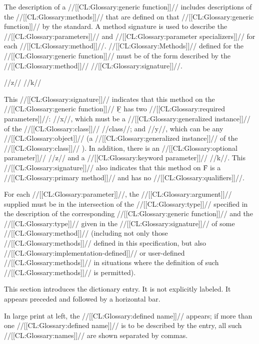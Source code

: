 The description of a //[[CL:Glossary:generic function]]// includes descriptions of the
//[[CL:Glossary:methods]]// that are defined on that //[[CL:Glossary:generic function]]// by the standard.  
A method signature is used to describe the //[[CL:Glossary:parameters]]// and 
//[[CL:Glossary:parameter specializers]]// for each //[[CL:Glossary:method]]//. 
//[[CL:Glossary:Methods]]// defined for the //[[CL:Glossary:generic function]]// must be of the form described
by the //[[CL:Glossary:method]]// //[[CL:Glossary:signature]]//. 

 {
	      {\opt} //z// {\key} //k//}

\noindent This //[[CL:Glossary:signature]]// indicates that this method on the //[[CL:Glossary:generic function]]//
\b{F} has two //[[CL:Glossary:required parameters]]//:
     //x//, which must be a //[[CL:Glossary:generalized instance]]// of the //[[CL:Glossary:class]]// //class//;
 and //y//, which can  be any //[[CL:Glossary:object]]// 
       (\ie a //[[CL:Glossary:generalized instance]]// of the //[[CL:Glossary:class]]// ).
In addition, there is an //[[CL:Glossary:optional parameter]]// //z// and a
//[[CL:Glossary:keyword parameter]]// //k//.  This //[[CL:Glossary:signature]]// also indicates that this
method on \f{F} is a //[[CL:Glossary:primary method]]// and has no //[[CL:Glossary:qualifiers]]//.

For each //[[CL:Glossary:parameter]]//, the //[[CL:Glossary:argument]]// supplied must be in the
intersection of the //[[CL:Glossary:type]]// specified in the description of the
corresponding //[[CL:Glossary:generic function]]// and the //[[CL:Glossary:type]]// given in 
the //[[CL:Glossary:signature]]// of some //[[CL:Glossary:method]]// (including not only those 
//[[CL:Glossary:methods]]// defined in this specification, but also
//[[CL:Glossary:implementation-defined]]// or user-defined //[[CL:Glossary:methods]]// in situations
where the definition of such //[[CL:Glossary:methods]]// is permitted).

\endsubsubsection%


This section introduces the dictionary entry.  It is not explicitly labeled.
It appears preceded and followed by a horizontal bar.

In large print at left, the //[[CL:Glossary:defined name]]// appears; if more than one
//[[CL:Glossary:defined name]]// is to be described by the entry, all such //[[CL:Glossary:names]]// 
are shown separated by commas.

